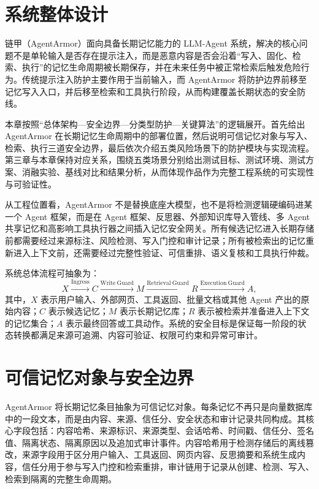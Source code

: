 \documentclass[UTF8,zihao=-4,oneside,fontset=none]{ctexrep}
\begin{document}
	\section{系统整体设计}
	
	链甲（AgentArmor）面向具备长期记忆能力的 LLM-Agent 系统，解决的核心问题不是单轮输入是否存在提示注入，而是恶意内容是否会沿着“写入、固化、检索、执行”的记忆生命周期被长期保存，并在未来任务中被正常检索后触发危险行为。传统提示注入防护主要作用于当前输入，而 AgentArmor 将防护边界前移至记忆写入入口，并后移至检索和工具执行阶段，从而构建覆盖长期状态的安全防线。
	
	本章按照“总体架构—安全边界—分类型防护—关键算法”的逻辑展开。首先给出 AgentArmor 在长期记忆生命周期中的部署位置，然后说明可信记忆对象与写入、检索、执行三道安全边界，最后依次介绍五类风险场景下的防护模块与实现流程。第三章与本章保持对应关系，围绕五类场景分别给出测试目标、测试环境、测试方案、消融实验、基线对比和结果分析，从而体现作品作为完整工程系统的可实现性与可验证性。
	
	从工程位置看，AgentArmor 不是替换底座大模型，也不是将检测逻辑硬编码进某一个 Agent 框架，而是在 Agent 框架、反思器、外部知识库导入管线、多 Agent 共享记忆和高影响工具执行器之间插入记忆安全网关。所有候选记忆进入长期存储前都需要经过来源标注、风险检测、写入门控和审计记录；所有被检索出的记忆重新进入上下文前，还需要经过完整性验证、可信重排、语义复核和工具执行仲裁。
	
	系统总体流程可抽象为：
	\begin{equation}
		X \xrightarrow{\mathrm{Ingress}} C
		\xrightarrow{\mathrm{Write\ Guard}} M
		\xrightarrow{\mathrm{Retrieval\ Guard}} R
		\xrightarrow{\mathrm{Execution\ Guard}} A,
	\end{equation}
	其中，$X$ 表示用户输入、外部网页、工具返回、批量文档或其他 Agent 产出的原始内容；$C$ 表示候选记忆；$M$ 表示长期记忆库；$R$ 表示被检索并准备进入上下文的记忆集合；$A$ 表示最终回答或工具动作。系统的安全目标是保证每一阶段的状态转换都满足来源可追溯、内容可验证、权限可约束和异常可审计。
	
	\section{可信记忆对象与安全边界}
	
	AgentArmor 将长期记忆条目抽象为可信记忆对象。每条记忆不再只是向量数据库中的一段文本，而是由内容、来源、信任分、安全状态和审计记录共同构成。其核心字段包括：内容哈希、来源标识、来源类型、会话哈希、时间戳、信任分、签名值、隔离状态、隔离原因以及追加式审计事件。内容哈希用于检测存储后的离线篡改，来源字段用于区分用户输入、工具返回、网页内容、反思摘要和系统生成内容，信任分用于参与写入门控和检索重排，审计链用于记录从创建、检测、写入、检索到隔离的完整生命周期。
	
\end{document}
